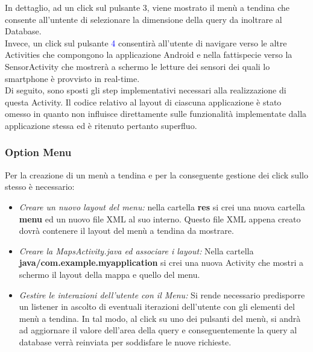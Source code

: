 In dettaglio, ad un click sul pulsante \textcolor{mypink}{3}, viene mostrato il menù a tendina che consente all'untente di selezionare la dimensione della query da inoltrare al Database.\\
Invece, un click sul pulsante \textcolor{blue}{4} consentirà all'utente di navigare verso le altre Activities che compongono la applicazione Android e nella fattispecie verso la SensorActivity che mostrerà a schermo le letture dei sensori dei quali lo smartphone è provvisto in real-time.\\
Di seguito, sono sposti gli step implementativi necessari alla realizzazione di questa Activity. Il codice relativo al layout di ciascuna applicazione è stato omesso in quanto non influisce direttamente sulle funzionalità implementate dalla applicazione stessa ed è ritenuto pertanto superfluo.

\subsubsection{Option Menu}
Per la creazione di un menù a tendina e per la conseguente gestione dei click sullo stesso è necessario:
\begin{itemize}
	\item \textit{Creare un nuovo layout del menu:} nella cartella \textbf{res} si crei una nuova cartella \textbf{menu} ed un nuovo file XML al suo interno. Questo file XML appena creato dovrà contenere il layout del menù a tendina da mostrare.
	
	\item \textit{Creare la MapsActivity.java ed associare i layout:} Nella cartella\\ \textbf{java/com.example.myapplication} si crei una nuova Activity che mostri a schermo il layout della mappa e quello del menu.
	
	
	\item \textit{Gestire le interazioni dell'utente con il Menu:} Si rende necessario predisporre un listener in ascolto di eventuali iterazioni dell'utente con gli elementi del menù a tendina. In tal modo, al click su uno dei pulsanti del menù, si andrà ad aggiornare il valore dell'area della query e conseguentemente la query al database verrà reinviata per soddisfare le nuove richieste.
	
\end{itemize}

